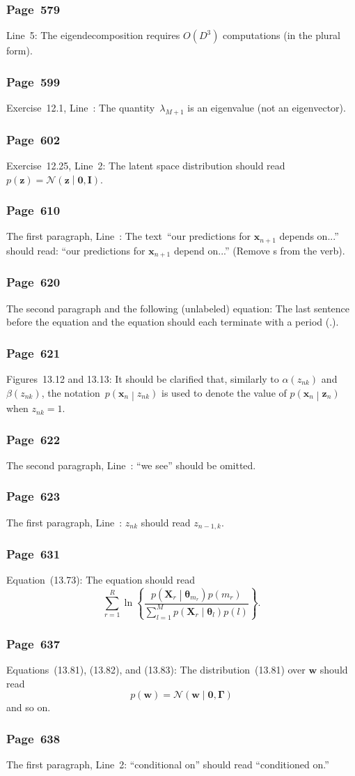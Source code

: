 \documentclass[12pt,a4paper]{article}
\newcommand{\erratum}[1]{\subsubsection*{#1}}
\begin{document}
\erratum{Page~579}
Line~5:
The eigendecomposition requires $O(D^3)$ computations (in the plural form).

\erratum{Page~599}
Exercise~12.1, Line~:
The quantity~$\lambda_{M + 1}$ is an eigenvalue (not an eigenvector).

\erratum{Page~602}
Exercise~12.25, Line~2:
The latent space distribution should read
$p(\mathbf{z}) = \mathcal{N}\left( \mathbf{z} \middle| \mathbf{0}, \mathbf{I}\right)$.

\erratum{Page~610}
The first paragraph, Line~:
The text~``our predictions for $\mathbf{x}_{n + 1}$ depends on...'' should read:
``our predictions for $\mathbf{x}_{n + 1}$ depend on...'' (Remove s from the verb).

\erratum{Page~620}
The second paragraph and the following (unlabeled) equation:
The last sentence before the equation and the equation should each terminate with a period (.).

\erratum{Page~621}
Figures~13.12 and 13.13:
It should be clarified that, similarly to $\alpha(z_{nk})$ and $\beta(z_{nk})$,
the notation~$p\left(\mathbf{x}_n \middle| z_{nk}\right)$ is used to denote
the value of $p\left(\mathbf{x}_n \middle| \mathbf{z}_{n}\right)$ when $z_{nk} = 1$.

\erratum{Page~622}
The second paragraph, Line~:
``we see'' should be omitted.

\erratum{Page~623}
The first paragraph, Line~:
$z_{nk}$ should read $z_{n - 1, k}$.

\erratum{Page~631}
Equation~(13.73):
The equation should read
\begin{equation}
\sum_{r=1}^{R} \ln \left\{
  \frac{p\left(\mathbf{X}_{r}\middle|\bm{\theta}_{m_r}\right)p(m_r)}{
    \sum_{l=1}^{M}p\left(\mathbf{X}_{r}\middle|\bm{\theta}_{l}\right)p(l)} \right\} .
\end{equation}

\erratum{Page~637}
Equations~(13.81), (13.82), and (13.83):
The distribution~(13.81) over $\mathbf{w}$ should read
\begin{equation}
p(\mathbf{w}) = \mathcal{N}\left(\mathbf{w}\middle|\mathbf{0}, \bm{\Gamma}\right)
\end{equation}
and so on.

\erratum{Page~638}
The first paragraph, Line~2:
``conditional on'' should read ``conditioned on.''
\end{document}
